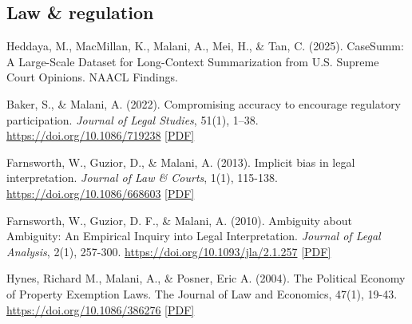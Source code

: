     \subsection*{Law \& regulation}
    
    \begin{tablist}

        \item[2025] \tab{}Heddaya, M., MacMillan, K., Malani, A., Mei, H., \& Tan, C. (2025). CaseSumm: A Large-Scale Dataset for Long-Context Summarization from U.S. Supreme Court Opinions. NAACL Findings. 
        
        \item[2022] \tab{}Baker, S., \& Malani, A. (2022). Compromising accuracy to encourage regulatory participation. \textit{Journal of Legal Studies}, 51(1), 1–38. \href{https://doi.org/10.1086/719238}{https://doi.org/10.1086/719238} \href{https://github.com/anup-malani/website_personal/blob/main/publications/2022_BakerMalani_JLS_CompromisingAccuracy.pdf}{[PDF]}
                    
        \item[2013] \tab{}Farnsworth, W., Guzior, D., \& Malani, A. (2013). Implicit bias in legal interpretation. \textit{Journal of Law \& Courts}, 1(1), 115-138. \href{https://doi.org/10.1086/668603}{https://doi.org/10.1086/668603} \href{https://github.com/anup-malani/website_personal/blob/main/publications/2013_FarnsworthGuziorMalani_PolicyPreferencesLegalInterpretation.pdf}{[PDF]} 
        
        \item[2010] \tab{}Farnsworth, W., Guzior, D. F., \& Malani, A. (2010). Ambiguity about Ambiguity: An Empirical Inquiry into Legal Interpretation. \textit{Journal of Legal Analysis}, 2(1), 257-300. \href{https://doi.org/10.1093/jla/2.1.257}{https://doi.org/10.1093/jla/2.1.257} \href{https://github.com/anup-malani/website_personal/blob/main/publications/2010_FarnsworthGuziorMalani_JLA_Ambiguity.pdf}{[PDF]}
    
        \item[2004] \tab{}Hynes, Richard M., Malani, A., \& Posner, Eric A. (2004). The Political Economy of Property Exemption Laws. The Journal of Law and Economics, 47(1), 19-43. \href{https://doi.org/10.1086/386276}{https://doi.org/10.1086/386276} \href{https://github.com/anup-malani/website_personal/blob/main/publications/2004_HynesMalaniPosner_JLE_PropertyExemptionLaws.pdf}{[PDF]}

    \end{tablist}

